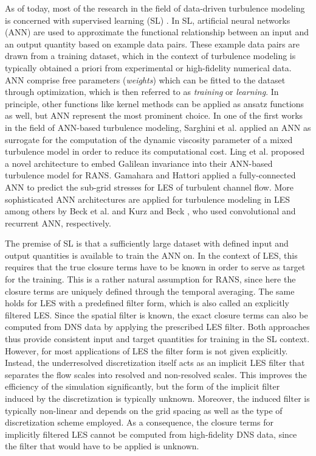 As of today, most of the research in the field of data-driven turbulence modeling is concerned with supervised learning (SL) \cite{brunton2020machine,beck2021perspective,duraisamy2019turbulence}.
In SL, artificial neural networks (ANN) are used to approximate the functional relationship between an input and an output quantity based on example data pairs.
These example data pairs are drawn from a training dataset, which in the context of turbulence modeling is typically obtained a priori from experimental or high-fidelity numerical data.
ANN comprise free parameters (\textit{weights}) which can be fitted to the dataset through optimization, which is then referred to as \textit{training} or \textit{learning}.
In principle, other functions like kernel methods \cite{wenzel2021novel} can be applied as ansatz functions as well, but ANN represent the most prominent choice.
In one of the first works in the field of ANN-based turbulence modeling, Sarghini et al. \cite{sarghini2003neural} applied an ANN as surrogate for the computation of the dynamic viscosity parameter of a mixed turbulence model in order to reduce its computational cost.
Ling et al. \cite{ling2016reynolds} proposed a novel architecture to embed Galilean invariance into their ANN-based turbulence model for RANS.
Gamahara and Hattori \cite{gamahara2017searching} applied a fully-connected ANN to predict the sub-grid stresses for LES of turbulent channel flow.
More sophisticated ANN architectures are applied for turbulence modeling in LES among others by Beck et al. \cite{beck2019deep} and Kurz and Beck \cite{kurz2022machine}, who used convolutional and recurrent ANN, respectively.


The premise of SL is that a sufficiently large dataset with defined input and output quantities is available to train the ANN on.
In the context of LES, this requires that the true closure terms have to be known in order to serve as target for the training.
This is a rather natural assumption for RANS, since here the closure terms are uniquely defined through the temporal averaging.
The same holds for LES with a predefined filter form, which is also called an explicitly filtered LES.
Since the spatial filter is known, the exact closure terms can also be computed from DNS data by applying the prescribed LES filter.
Both approaches thus provide consistent input and target quantities for training in the SL context.
However, for most applications of LES the filter form is not given explicitly.
Instead, the underresolved discretization itself acts as an implicit LES filter that separates the flow scales into resolved and non-resolved scales.
This improves the efficiency of the simulation significantly, but the form of the implicit filter induced by the discretization is typically unknown.
Moreover, the induced filter is typically non-linear and depends on the grid spacing as well as the type of discretization scheme employed.
As a consequence, the closure terms for implicitly filtered LES cannot be computed from high-fidelity DNS data, since the filter that would have to be applied is unknown.

